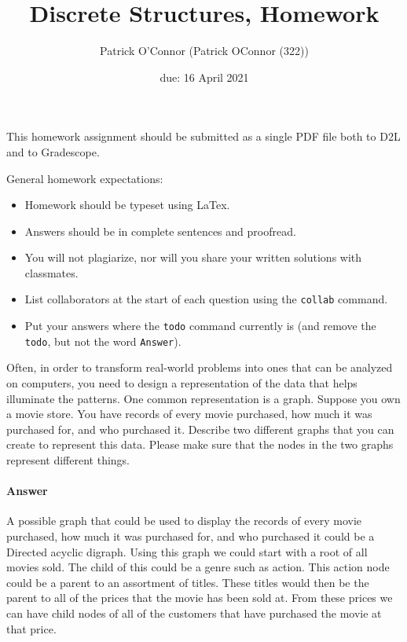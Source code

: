 \documentclass{article}
\title{Discrete Structures, Homework \hwnum}
\author{Patrick O'Connor (Patrick OConnor (322))}
\date{due: 16 April 2021}
\begin{document}
\maketitle

This homework assignment should be
submitted as a single PDF file both to D2L and to Gradescope.

General homework expectations:
\begin{itemize}
    \item Homework should be typeset using LaTex.
    \item Answers should be in complete sentences and proofread.
    \item You will not plagiarize, nor will you share your written solutions
        with classmates.
    \item List collaborators at the start of each question using the \texttt{collab} command.
    \item Put your answers where the \texttt{todo} command currently is (and
        remove the \texttt{todo}, but not the word \texttt{Answer}).
\end{itemize}


 

Often, in order to transform real-world problems into ones that can be analyzed
on computers, you need to design a representation of the data that helps
illuminate the patterns.  One common representation is a graph.  Suppose you own
a movie store.  You have records of every movie purchased, how much it was
purchased for, and who purchased it.  Describe two different graphs that you can
create to represent this data.  Please make sure that the nodes in the two
graphs represent different things.

\paragraph{Answer}


A possible graph that could be used to display the records of every movie purchased, how much it was purchased for, and who purchased it could be a Directed acyclic digraph. 
Using this graph we could start with a root of all movies sold. The child of this could be a genre such as action. This action node could be a parent to an assortment of titles.
These titles would then be the parent to all of the prices that the movie has been sold at. From these prices we can have child nodes of all of the customers that have purchased the movie at that price.
\end{document}
